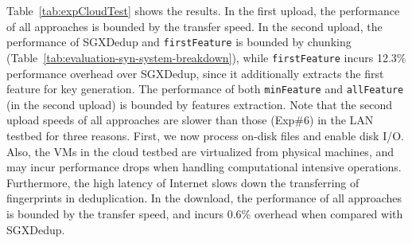 Table~\ref{tab:expCloudTest} shows the results. In the first upload, the performance of all approaches is bounded by the transfer speed. In the second upload, the performance of SGXDedup and {\tt firstFeature} is bounded by chunking (Table~\ref{tab:evaluation-syn-system-breakdown}), while {\tt firstFeature} incurs 12.3\% performance overhead over SGXDedup, since it additionally extracts the first feature for key generation. The performance of both {\tt minFeature} and {\tt allFeature} (in the second upload) is bounded by features extraction. Note that the second upload speeds of all approaches are slower than those (Exp\#6) in the LAN testbed for three reasons. First, we now process on-disk files and enable disk I/O. Also, the VMs in the cloud testbed are virtualized from physical machines, and may incur performance drops when handling computational intensive operations.
Furthermore, the high latency of Internet slows down the  transferring of fingerprints in deduplication.
In the download, the performance of all approaches is bounded by the transfer speed, and \prototype incurs 0.6\% overhead when compared with SGXDedup.





